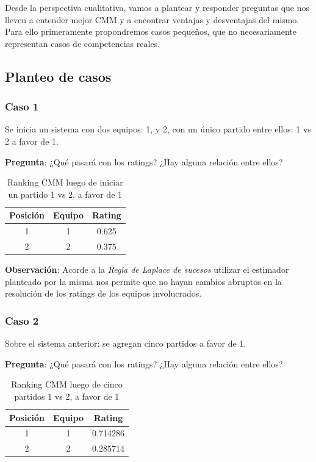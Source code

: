 Desde la perspectiva cualitativa, vamos a plantear y responder preguntas que nos lleven a entender mejor CMM y a encontrar ventajas y desventajas del mismo. Para ello primeramente propondremos casos pequeños, que no necesariamente representan casos de competencias reales.

\subsection{Planteo de casos}

\subsubsection*{Caso 1}
Se inicia un sistema con dos equipos: 1, y 2, con un único partido entre ellos: 1 vs 2 a favor de 1.

\textbf{Pregunta}: ¿Qué pasará con los ratings? ¿Hay alguna relación entre ellos?

\begin{table}[h!]
    \begin{center}
        \begin{tabular}{|c|c|c|}
        \hline
        \textbf{Posición} & \textbf{Equipo} & \textbf{Rating} \\
        \hline
        1 & 1 & 0.625\\
        2 & 2 & 0.375\\
        \hline
        \end{tabular}
        \caption{Ranking CMM luego de iniciar un partido 1 vs 2, a favor de 1}
        \label{cmm_caso_1}
    \end{center}
\end{table}

\textbf{Observación}: Acorde a la \textit{Regla de Laplace de sucesos} utilizar el estimador planteado por la misma nos permite que no hayan cambios abruptos en la resolución de los ratings de los equipos involucrados.

\subsubsection*{Caso 2}

Sobre el sistema anterior: se agregan cinco partidos a favor de 1.

\textbf{Pregunta}: ¿Qué pasará con los ratings? ¿Hay alguna relación entre ellos?

\begin{table}[h!]
    \begin{center}
        \begin{tabular}{|c|c|c|}
        \hline
        \textbf{Posición} & \textbf{Equipo} & \textbf{Rating} \\
        \hline
        1 & 1 & 0.714286\\
        2 & 2 & 0.285714\\
        \hline
        \end{tabular}
        \caption{Ranking CMM luego de cinco partidos 1 vs 2, a favor de 1}
        \label{cmm_caso_2}
    \end{center}
\end{table}

